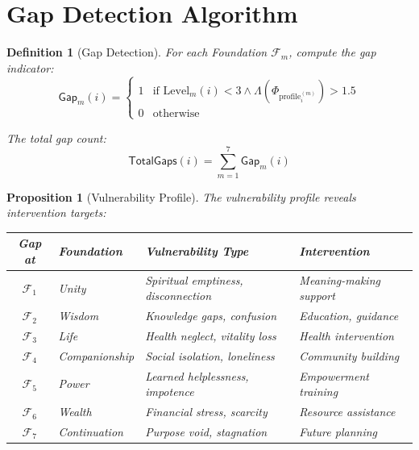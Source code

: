 \documentclass[11pt,twoside]{book}
\renewcommand{\arraystretch}{1.2}
\newcommand{\Foundations}{\mathcal{F}}
\newcommand{\Lacunarity}{\Lambda}
\newcommand{\ProfileFrac}{\Phi_{\mathrm{profile}}}
\newtheorem{definition}{Definition}[chapter]
\newtheorem{proposition}{Proposition}[chapter]
\begin{document}
\section{Gap Detection Algorithm}

\begin{definition}[Gap Detection]
\label{def:gap-detect}
For each Foundation $\Foundations_m$, compute the \emph{gap indicator}:
\[
    \mathsf{Gap}_m(i) =
    \begin{cases}
        1 & \text{if } \mathrm{Level}_m(i) < 3 \land \Lacunarity(\ProfileFrac_i^{(m)}) > 1.5 \\
        0 & \text{otherwise}
    \end{cases}
\]

The \emph{total gap count}:
\[
    \mathsf{TotalGaps}(i) = \sum_{m=1}^{7} \mathsf{Gap}_m(i)
\]
\end{definition}

\begin{proposition}[Vulnerability Profile]
\label{prop:vuln-profile}
The vulnerability profile reveals intervention targets:

\begin{center}
\renewcommand{\arraystretch}{1.3}
\begin{tabularx}{\textwidth}{c|l|X|l}
\toprule
\textbf{Gap at} & \textbf{Foundation} & \textbf{Vulnerability Type} & \textbf{Intervention} \\
\midrule
$\Foundations_1$ & Unity & Spiritual emptiness, disconnection & Meaning-making support \\
$\Foundations_2$ & Wisdom & Knowledge gaps, confusion & Education, guidance \\
$\Foundations_3$ & Life & Health neglect, vitality loss & Health intervention \\
$\Foundations_4$ & Companionship & Social isolation, loneliness & Community building \\
$\Foundations_5$ & Power & Learned helplessness, impotence & Empowerment training \\
$\Foundations_6$ & Wealth & Financial stress, scarcity & Resource assistance \\
$\Foundations_7$ & Continuation & Purpose void, stagnation & Future planning \\
\bottomrule
\end{tabularx}
\end{center}
\end{proposition}

\end{document}
